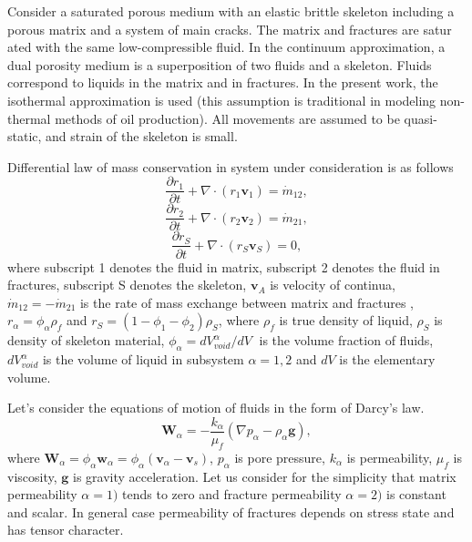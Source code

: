\documentclass[article,authoryear,jpm]{beg_39}             %
\begin{document}
Consider a saturated porous medium with an elastic brittle skeleton including a porous matrix and a system of main cracks.
The matrix and fractures are satur ated with the same low-compressible fluid.
In the continuum approximation, a dual porosity medium is a superposition of two fluids and a skeleton.
Fluids correspond to liquids in the matrix and in fractures.
In the present work, the isothermal approximation is used (this assumption is traditional in modeling non-thermal methods of oil production).
All movements are assumed to be quasi-static, and strain of the skeleton is small.

Differential law of mass conservation in system under consideration is as follows
\begin{equation}
\frac{\partial {{r}_{1}}}{\partial t}+\nabla \cdot \left( {{r}_{1}}{{\mathbf{v}}_{1}} \right)={{\dot{m}}_{12}},
\end{equation}
\begin{equation}
\frac{\partial {{r}_{2}}}{\partial t}+\nabla \cdot \left( {{r}_{2}}{{\mathbf{v}}_{2}} \right)={{\dot{m}}_{21}},
\end{equation}
\begin{equation}
\frac{\partial {{r}_{S}}}{\partial t}+\nabla \cdot \left( {{r}_{S}}{{\mathbf{v}}_{S}} \right)=0,
\end{equation}
where subscript 1 denotes the fluid in matrix, subscript 2 denotes the fluid in fractures, subscript S denotes the skeleton, ${{\mathbf{v}}_{A}}$ is velocity of continua, ${{\dot{m}}_{12}}=-{{\dot{m}}_{21}}$ is the rate of mass exchange between matrix and fractures , ${{r}_{\alpha }}={{\phi }_{\alpha }}{{\rho }_{f}}$ and ${{r}_{S}}=(1-{{\phi }_{1}}-{{\phi }_{2}}){{\rho }_{S}}$, where ${{\rho }_{f}}$ is true density of liquid, ${{\rho }_{S}}$ is density of skeleton material, ${{\phi }_{\alpha }}={dV_{void}^{\alpha }}/{dV}\;$ is the volume fraction of fluids, $dV_{void}^{\alpha }$ is the volume of liquid in subsystem $\alpha=1,2$ and $dV$ is the elementary volume.

Let’s consider the equations of motion of fluids in the form of Darcy’s law.
\begin{equation}
{{\mathbf{W}}_{\alpha }}=-\frac{{{k}_{\alpha }}}{{{\mu }_{f}}}\left( \nabla {{p}_{\alpha }}-{{\rho }_{\alpha }}\mathbf{g} \right),
\end{equation}
where ${{\mathbf{W}}_{\alpha }}={{\phi }_{\alpha }}{{\mathbf{w}}_{\alpha }}={{\phi }_{\alpha }}\left( {{\mathbf{v}}_{\alpha }}-{{\mathbf{v}}_{s}} \right)$, ${{p}_{\alpha }}$ is pore pressure, ${{k}_{\alpha }}$ is permeability, ${{\mu }_{f}}$ is viscosity, $\mathbf{g}$ is gravity acceleration. Let us consider for the simplicity that matrix permeability ${\alpha}=1)$ tends to zero and fracture permeability ${\alpha}=2)$ is constant and scalar.
In general case permeability of fractures depends on stress state and has tensor character.
\end{document}
